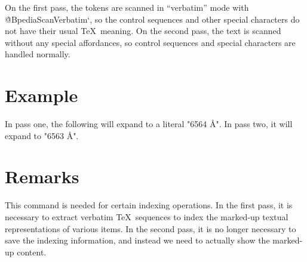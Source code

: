 On the first pass, the tokens are scanned in “verbatim” mode with
\`@BpediaScanVerbatim`, so the control sequences and other special characters do
not have their usual \TeX\ meaning. On the second pass, the text is scanned
without any special affordances, so control sequences and special characters are
handled normally.

\section*{Example}

\begin{texdisp}
\pediaPassOneVerbatim{6563 \AA}
\makeatletter
In pass one, the following will expand to a literal "6564 \AA". In pass
two, it will expand to "6563 Å".
\the\pedia@maybeVerbatimToks
\makeatother
\end{texdisp}

\section*{Remarks}

This command is needed for certain indexing operations. In the first pass, it is
necessary to extract verbatim \TeX\ sequences to index the marked-up textual
representations of various items. In the second pass, it is no longer necessary
to save the indexing information, and instead we need to actually show the
marked-up content.